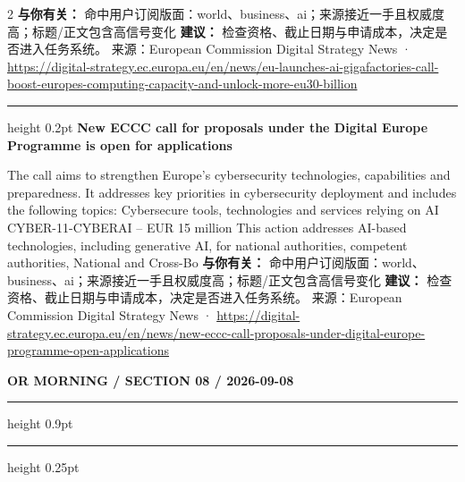 \documentclass[10.5pt]{ctexart}
\begin{document}
\begin{multicols}{2}
\textbf{与你有关：} 命中用户订阅版面：world、business、ai；来源接近一手且权威度高；标题/正文包含高信号变化
\textbf{建议：} 检查资格、截止日期与申请成本，决定是否进入任务系统。
{\footnotesize\color{ormuted} 来源：European Commission Digital Strategy News · \url{https://digital-strategy.ec.europa.eu/en/news/eu-launches-ai-gigafactories-call-boost-europes-computing-capacity-and-unlock-more-eu30-billion}}
\vspace{2mm}
\hrule height 0.2pt
\vspace{2mm}
{\large\bfseries New ECCC call for proposals under the Digital Europe Programme is open for applications}\par
The call aims to strengthen Europe’s cybersecurity technologies, capabilities and preparedness. It addresses key priorities in cybersecurity deployment and includes the following topics: Cybersecure tools, technologies and services relying on AI CYBER-11-CYBERAI – EUR 15 million This action addresses AI-based technologies, including generative AI, for national authorities, competent authorities, National and Cross-Bo
\textbf{与你有关：} 命中用户订阅版面：world、business、ai；来源接近一手且权威度高；标题/正文包含高信号变化
\textbf{建议：} 检查资格、截止日期与申请成本，决定是否进入任务系统。
{\footnotesize\color{ormuted} 来源：European Commission Digital Strategy News · \url{https://digital-strategy.ec.europa.eu/en/news/new-eccc-call-proposals-under-digital-europe-programme-open-applications}}
\end{multicols}
\newpage
{\small\bfseries OR MORNING / SECTION 08 / 2026-09-08}
\vspace{2mm}
\hrule height 0.9pt
\vspace{1.5mm}
\hrule height 0.25pt
\vspace{4mm}
\end{document}
